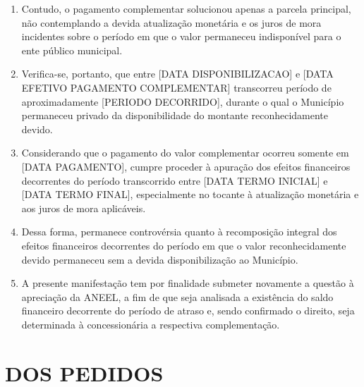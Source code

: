 \begin{enumerate}[resume]
    \item Contudo, o pagamento complementar solucionou apenas a parcela principal, não contemplando a devida atualização monetária e os juros de mora incidentes sobre o período em que o valor permaneceu indisponível para o ente público municipal.

    \item Verifica-se, portanto, que entre [DATA DISPONIBILIZACAO] e [DATA EFETIVO PAGAMENTO COMPLEMENTAR] transcorreu período de aproximadamente [PERIODO DECORRIDO], durante o qual o Município permaneceu privado da disponibilidade do montante reconhecidamente devido.

    \item Considerando que o pagamento do valor complementar ocorreu somente em [DATA PAGAMENTO], cumpre proceder à apuração dos efeitos financeiros decorrentes do período transcorrido entre [DATA TERMO INICIAL] e [DATA TERMO FINAL], especialmente no tocante à atualização monetária e aos juros de mora aplicáveis.

    \item Dessa forma, permanece controvérsia quanto à recomposição integral dos efeitos financeiros decorrentes do período em que o valor reconhecidamente devido permaneceu sem a devida disponibilização ao Município.

    \item A presente manifestação tem por finalidade submeter novamente a questão à apreciação da ANEEL, a fim de que seja analisada a existência do saldo financeiro decorrente do período de atraso e, sendo confirmado o direito, seja determinada à concessionária a respectiva complementação.
\end{enumerate}

\section{DOS PEDIDOS}

